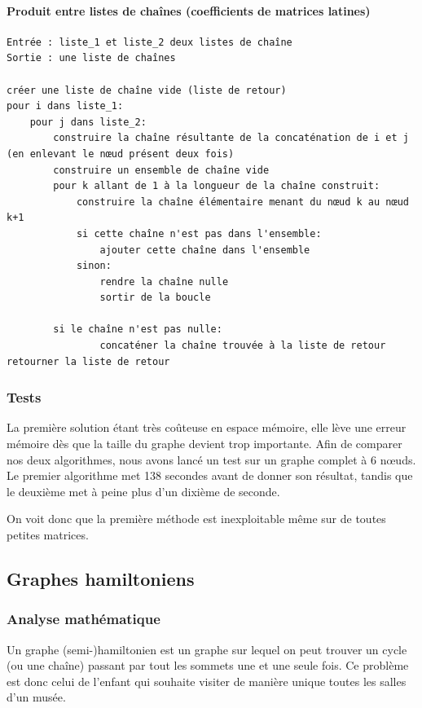    \paragraph{Produit entre listes de chaînes (coefficients de matrices
    latines)} \mbox{}
      \begin{lstlisting}
Entrée : liste_1 et liste_2 deux listes de chaîne 
Sortie : une liste de chaînes 

créer une liste de chaîne vide (liste de retour)
pour i dans liste_1:
    pour j dans liste_2:
        construire la chaîne résultante de la concaténation de i et j (en enlevant le nœud présent deux fois)
        construire un ensemble de chaîne vide
        pour k allant de 1 à la longueur de la chaîne construit:
            construire la chaîne élémentaire menant du nœud k au nœud k+1
            si cette chaîne n'est pas dans l'ensemble:
                ajouter cette chaîne dans l'ensemble
            sinon:
                rendre la chaîne nulle
                sortir de la boucle

        si le chaîne n'est pas nulle:
                concaténer la chaîne trouvée à la liste de retour
retourner la liste de retour
			\end{lstlisting}

  \subsubsection{Tests}
    La première solution étant très coûteuse en espace mémoire, elle lève une
    erreur mémoire dès que la taille du graphe devient trop importante.
    Afin de comparer nos deux algorithmes, nous avons lancé un test sur un
    graphe complet à 6 nœuds. Le premier algorithme met 138 secondes avant de
    donner son résultat, tandis que le deuxième met à peine plus d'un dixième
    de seconde.

    On voit donc que la première méthode est inexploitable même sur de toutes
    petites matrices.

\subsection{Graphes hamiltoniens}
  \subsubsection{Analyse mathématique}
    Un graphe (semi-)hamiltonien est un graphe sur lequel on peut
    trouver un cycle (ou une chaîne) passant par tout les sommets une et une
    seule fois. Ce problème est donc celui de l'enfant qui souhaite visiter de
    manière unique toutes les salles d'un musée.

